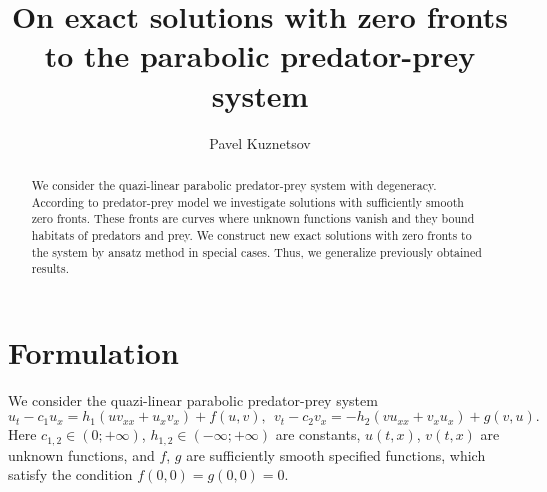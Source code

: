 \documentclass[12pt]{llncs}
\begin{document}
\fi

\title{On exact solutions with zero fronts to the parabolic predator-prey system%
}

\author{Pavel Kuznetsov 
}

\maketitle

\begin{abstract}
We consider the quazi-linear parabolic predator-prey system with degeneracy. According to predator-prey model we investigate solutions with sufficiently smooth zero fronts. These fronts are curves where unknown functions vanish and they bound habitats of predators and prey. We construct new exact solutions with zero fronts to the system by ansatz method in special cases. Thus, we generalize previously obtained results.

\end{abstract}


\section{Formulation} %

We consider the quazi-linear parabolic predator-prey system \cite{Mur2003}
\begin{equation}\label{Kuz01}
u_t-c_1u_x=h_1\left(uv_{xx}+u_xv_x\right)+f(u,v),~~%
v_t-c_2v_x=-h_2\left(vu_{xx}+v_xu_x\right)+g(v,u).
\end{equation}
Here $c_{1,2}\in(0;+\infty)$, $h_{1,2}\in(-\infty;+\infty)$ are constants, $u(t,x)$, $v(t,x)$ are unknown functions, and $f$, $g$ are sufficiently smooth specified functions, which satisfy the condition $f(0,0)=g(0,0)=0$.
\end{document}
